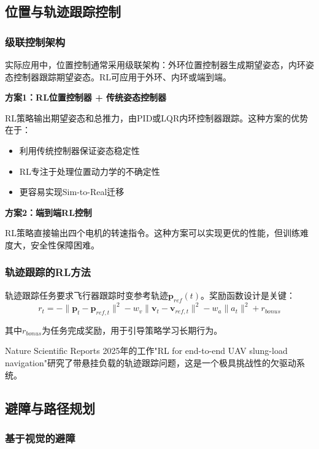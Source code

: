 \documentclass[12pt,a4paper]{ctexart}
\begin{document}
\subsection{位置与轨迹跟踪控制}

\subsubsection{级联控制架构}

实际应用中，位置控制通常采用级联架构：外环位置控制器生成期望姿态，内环姿态控制器跟踪期望姿态。RL可应用于外环、内环或端到端。

\textbf{方案1：RL位置控制器 + 传统姿态控制器}

RL策略输出期望姿态和总推力，由PID或LQR内环控制器跟踪。这种方案的优势在于：
\begin{itemize}
    \item 利用传统控制器保证姿态稳定性
    \item RL专注于处理位置动力学的不确定性
    \item 更容易实现Sim-to-Real迁移
\end{itemize}

\textbf{方案2：端到端RL控制}

RL策略直接输出四个电机的转速指令。这种方案可以实现更优的性能，但训练难度大，安全性保障困难。

\subsubsection{轨迹跟踪的RL方法}

轨迹跟踪任务要求飞行器跟踪时变参考轨迹$\mathbf{p}_{ref}(t)$。奖励函数设计是关键：
\begin{equation}
    r_t = -\|\mathbf{p}_t - \mathbf{p}_{ref,t}\|^2 - w_v \|\mathbf{v}_t - \mathbf{v}_{ref,t}\|^2 - w_a \|a_t\|^2 + r_{bonus}
\end{equation}

其中$r_{bonus}$为任务完成奖励，用于引导策略学习长期行为。

Nature Scientific Reports 2025年的工作"RL for end-to-end UAV slung-load navigation"研究了带悬挂负载的轨迹跟踪问题，这是一个极具挑战性的欠驱动系统。

\subsection{避障与路径规划}

\subsubsection{基于视觉的避障}
\end{document}
